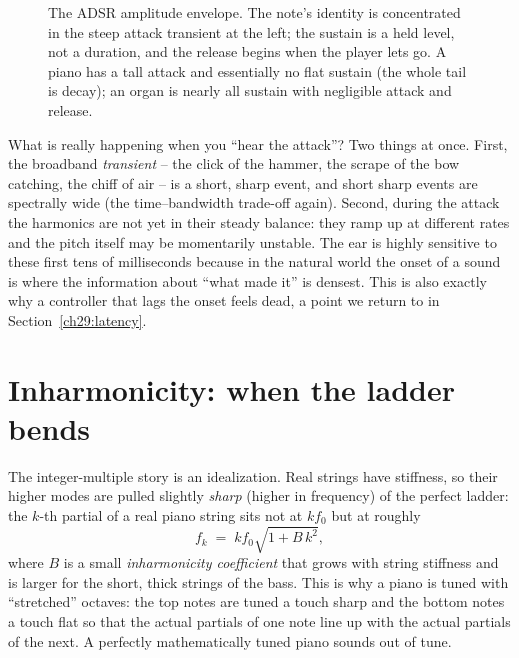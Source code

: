 \begin{figure}[H]
\centering
{}
\caption{The ADSR amplitude envelope. The note's identity is concentrated in the steep attack
transient at the left; the sustain is a held level, not a duration, and the release begins when the
player lets go. A piano has a tall attack and essentially no flat sustain (the whole tail is decay);
an organ is nearly all sustain with negligible attack and release.}
\label{ch29:fig-adsr}
\end{figure}

\begin{happeningbox}
What is really happening when you ``hear the attack''? Two things at once. First, the broadband
\emph{transient} -- the click of the hammer, the scrape of the bow catching, the chiff of air -- is a
short, sharp event, and short sharp events are spectrally wide (the time--bandwidth trade-off again).
Second, during the attack the harmonics are not yet in their steady balance: they ramp up at
different rates and the pitch itself may be momentarily unstable. The ear is highly sensitive to
these first tens of milliseconds because in the natural world the onset of a sound is where the
information about ``what made it'' is densest. This is also exactly why a controller that lags the
onset feels dead, a point we return to in Section~\ref{ch29:latency}.
\end{happeningbox}

\section{Inharmonicity: when the ladder bends}
\label{ch29:inharmonicity}

The integer-multiple story is an idealization. Real strings have stiffness, so their higher modes are
pulled slightly \emph{sharp} (higher in frequency) of the perfect ladder: the $k$-th partial of a real piano string sits
not at $k f_0$ but at roughly
\[
  f_k \;=\; k f_0 \sqrt{1 + B\,k^2},
\]
where $B$ is a small \emph{inharmonicity coefficient} that grows with string stiffness and is larger
for the short, thick strings of the bass. This is why a piano is tuned with ``stretched'' octaves:
the top notes are tuned a touch sharp and the bottom notes a touch flat so that the actual partials
of one note line up with the actual partials of the next. A perfectly mathematically tuned piano
sounds out of tune.

